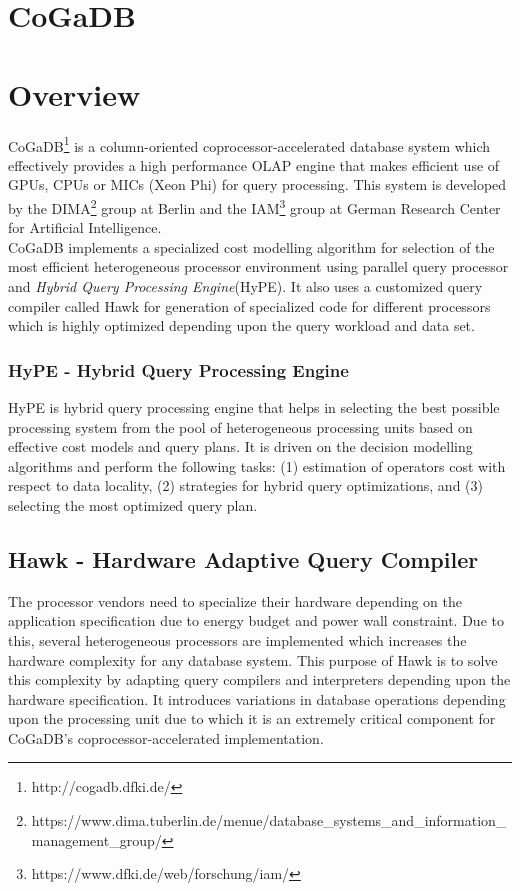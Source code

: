 \documentclass[a4paper, 11pt]{article}
\begin{document}
\section*{CoGaDB}
\section*{Overview}
CoGaDB\footnote{http://cogadb.dfki.de/} is a column-oriented coprocessor-accelerated database system which effectively provides a high performance OLAP engine that makes efficient use of GPUs, CPUs or MICs (Xeon Phi) for query processing. This system is developed by the DIMA\footnote{https://www.dima.tu\text{-}berlin.de/menue/database\_systems\_and\_information\_management\_group/} group at Berlin and the IAM\footnote{https://www.dfki.de/web/forschung/iam/} group at German Research Center for Artificial Intelligence.
\\
CoGaDB implements a specialized cost modelling algorithm for selection of the most efficient heterogeneous processor environment using parallel query processor and \emph{Hybrid Query Processing Engine}(HyPE)\cite{cogadb_hype}. It also uses a customized query compiler called Hawk\cite{cogadb_hawk} for generation of specialized code for different processors which is highly optimized depending upon the query workload and data set.

\subsubsection*{HyPE - Hybrid Query Processing Engine}
HyPE is hybrid query processing engine that helps in selecting the best possible processing system from the pool of heterogeneous processing units based on effective cost models and query plans. It is driven on the decision modelling algorithms and perform the following tasks\cite{cogadb_hype}: (1) estimation of operators cost with respect to data locality, (2) strategies for hybrid query optimizations, and (3) selecting the most optimized query plan.

\subsection*{Hawk - Hardware Adaptive Query Compiler}
The processor vendors need to specialize their hardware depending on the application specification due to energy budget and power wall\cite{microprocessors} constraint. Due to this, several heterogeneous processors are implemented which increases the hardware complexity for any database system. This purpose of Hawk\cite{cogadb_hawk} is to solve this complexity by adapting query compilers and interpreters depending upon the hardware specification. It introduces variations in database operations depending upon the processing unit due to which it is an extremely critical component for CoGaDB's coprocessor-accelerated implementation.
\end{document}
